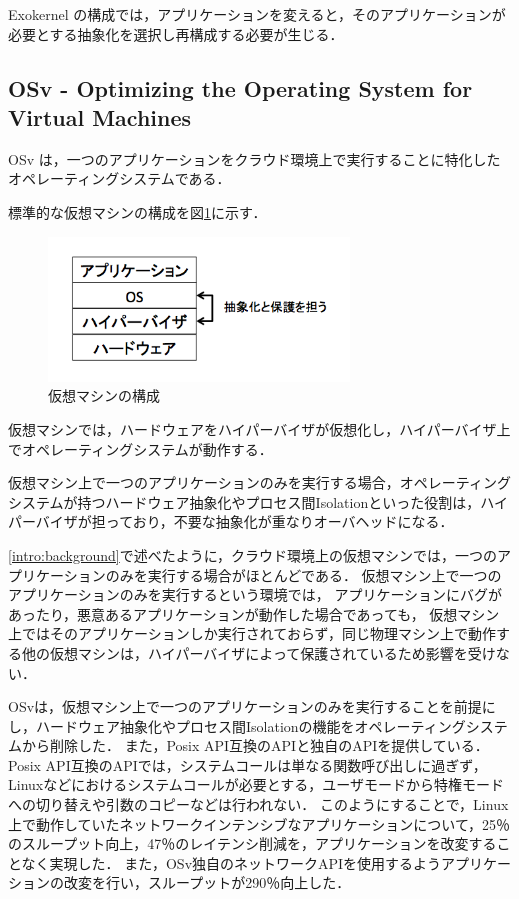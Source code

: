 \documentclass[graduation-thesis]{mlarticle}
\begin{document}

Exokernel の構成では，アプリケーションを変えると，そのアプリケーションが必要とする抽象化を選択し再構成する必要が生じる．

\subsection {OSv - Optimizing the Operating System for Virtual Machines}
\label{relative:unikernel}
OSv は，一つのアプリケーションをクラウド環境上で実行することに特化したオペレーティングシステムである．

標準的な仮想マシンの構成を図\ref{fig:vm}に示す．

\begin{figure}[H]
  \begin{center}
    \includegraphics[width=8.0cm]{images/vm.png}
    \caption{仮想マシンの構成}
    \label{fig:vm}
  \end{center}
\end{figure}

仮想マシンでは，ハードウェアをハイパーバイザが仮想化し，ハイパーバイザ上でオペレーティングシステムが動作する．

仮想マシン上で一つのアプリケーションのみを実行する場合，オペレーティングシステムが持つハードウェア抽象化やプロセス間Isolationといった役割は，ハイパーバイザが担っており，不要な抽象化が重なりオーバヘッドになる．

\ref{intro:background}で述べたように，クラウド環境上の仮想マシンでは，一つのアプリケーションのみを実行する場合がほとんどである．
仮想マシン上で一つのアプリケーションのみを実行するという環境では，
アプリケーションにバグがあったり，悪意あるアプリケーションが動作した場合であっても，
仮想マシン上ではそのアプリケーションしか実行されておらず，同じ物理マシン上で動作する他の仮想マシンは，ハイパーバイザによって保護されているため影響を受けない．

OSvは，仮想マシン上で一つのアプリケーションのみを実行することを前提にし，ハードウェア抽象化やプロセス間Isolationの機能をオペレーティングシステムから削除した．
また，Posix API互換のAPIと独自のAPIを提供している．Posix API互換のAPIでは，システムコールは単なる関数呼び出しに過ぎず，Linuxなどにおけるシステムコールが必要とする，ユーザモードから特権モードへの切り替えや引数のコピーなどは行われない．
このようにすることで，Linux上で動作していたネットワークインテンシブなアプリケーションについて，25％のスループット向上，47％のレイテンシ削減を，アプリケーションを改変することなく実現した．
また，OSv独自のネットワークAPIを使用するようアプリケーションの改変を行い，スループットが290％向上した．
\end{document}

